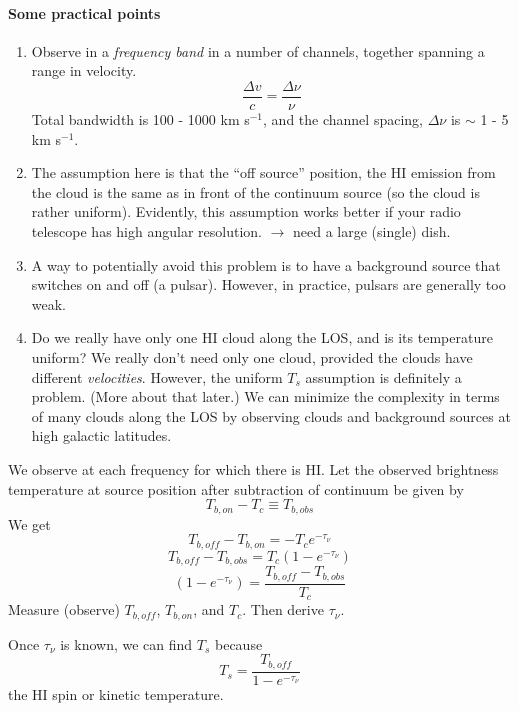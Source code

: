 \documentclass[11pt]{article}
\newcommand{\mar}[1]{\hspace{0pt}\marginpar{-\textcolor{black}{#1}-}}
\begin{document}
\paragraph{Some practical points}
\begin{enumerate}
    \item Observe in a \textit{frequency band} in a number of channels,
        together spanning a range in velocity.
        \[
            \frac{\Delta{v}}{c} = \frac{\Delta\nu}{\nu}
            \]
        Total bandwidth is 100 - 1000 km s$^{-1}$, and the channel spacing,
        $\Delta\nu$ is $\sim$ 1 - 5 km s$^{-1}$.
    \item The assumption here is that the ``off source'' position, the HI
        emission from the cloud is the same as in front of the continuum
        source (so the cloud is rather uniform). Evidently, this assumption
        works better if your radio telescope has high angular resolution.
        $\rightarrow$ need a large (single) dish.
    \item A way to potentially avoid this problem is to have a background
        source that switches on and off (a pulsar). However, in practice,
        pulsars are generally too weak.
    \item Do we really have only one HI cloud along the LOS, and is
        its temperature uniform? We really don't need only one cloud,
        provided the clouds have different \emph{velocities}.
        However, the uniform $T_{s}$ assumption is definitely a problem.
        (More about that later.) We can minimize the complexity in terms of
        many clouds along the LOS by observing clouds and background
        sources at high galactic latitudes.
\end{enumerate}

\mar{43}We observe at each frequency for which there is HI.
Let the
observed brightness temperature at source position after subtraction of
continuum be given by
\[
    T_{b, on} - T_{c} \equiv T_{b, obs}
    \]
We get
\[
    T_{b, off} - T_{b, on} = -T_{c} e^{-\tau_{\nu}}
    \]
\[
    T_{b, off} - T_{b, obs} = T_{c} \left( 1 - e^{-\tau_{\nu}} \right)
    \]
\[
    \left( 1 - e^{-\tau_{\nu}} \right) = \frac{T_{b, off} - T_{b, obs}}{T_{c}}
    \]
Measure (observe) $T_{b, off}$, $T_{b, on}$, and $T_{c}$. Then derive
$\tau_{\nu}$.

Once $\tau_{\nu}$ is known, we can find $T_{s}$ because
\[
    T_{s} = \frac{T_{b,off}}{1 - e^{-\tau_{\nu}}}
    \]
the HI spin or kinetic temperature.
\end{document}
